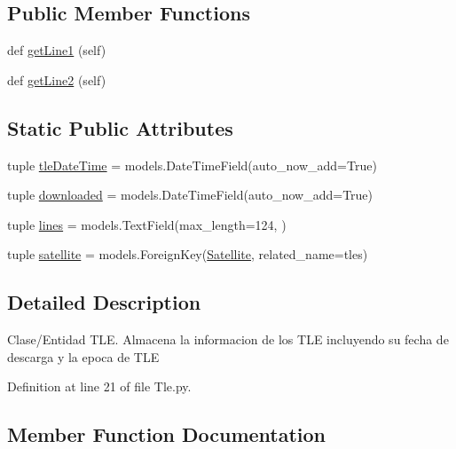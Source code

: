 \subsection*{Public Member Functions}
\begin{DoxyCompactItemize}
\item 
def \hyperlink{class_ground_segment_1_1models_1_1_tle_1_1_tle_aaa9c5ef171cfeab993957d279ded8364}{get\+Line1} (self)
\item 
def \hyperlink{class_ground_segment_1_1models_1_1_tle_1_1_tle_a904163c4f0018e52ddbd06a520787c6b}{get\+Line2} (self)
\end{DoxyCompactItemize}
\subsection*{Static Public Attributes}
\begin{DoxyCompactItemize}
\item 
tuple \hyperlink{class_ground_segment_1_1models_1_1_tle_1_1_tle_a66ec63c8a5d9f0a43b9aa48993e531a6}{tle\+Date\+Time} = models.\+Date\+Time\+Field(auto\+\_\+now\+\_\+add=True)
\item 
tuple \hyperlink{class_ground_segment_1_1models_1_1_tle_1_1_tle_ae3785c68a686c40d0505afe276d13d04}{downloaded} = models.\+Date\+Time\+Field(auto\+\_\+now\+\_\+add=True)
\item 
tuple \hyperlink{class_ground_segment_1_1models_1_1_tle_1_1_tle_ac5a4980b37f61f042cb30d0a268755eb}{lines} = models.\+Text\+Field(max\+\_\+length=124, )
\item 
tuple \hyperlink{class_ground_segment_1_1models_1_1_tle_1_1_tle_a95bfe88e371279e78d31945379bd3785}{satellite} = models.\+Foreign\+Key(\hyperlink{class_ground_segment_1_1models_1_1_satellite_1_1_satellite}{Satellite}, related\+\_\+name=\textquotesingle{}tles\textquotesingle{})
\end{DoxyCompactItemize}


\subsection{Detailed Description}
\begin{DoxyVerb}Clase/Entidad TLE.
Almacena la informacion de los TLE incluyendo su fecha de descarga y la epoca de TLE 
\end{DoxyVerb}
 

Definition at line 21 of file Tle.\+py.



\subsection{Member Function Documentation}
\hypertarget{class_ground_segment_1_1models_1_1_tle_1_1_tle_aaa9c5ef171cfeab993957d279ded8364}{}
